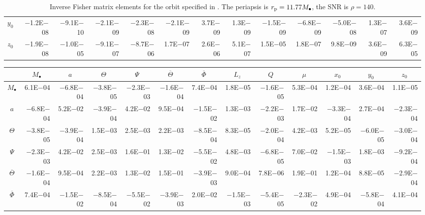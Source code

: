 \begin{sidewaystable}[htbp]
\begin{tabular}{crrrrrrrrrrrr}
$y_0$ & $-$1.2E$-$08 & $-$9.1E$-$10 & $-$2.1E$-$09 & $-$2.3E$-$08 & $-$2.1E$-$09 & 3.7E$-$09 & 1.3E$-$09 & $-$1.5E$-$09 & $-$6.8E$-$09 & $-$5.0E$-$08 & 1.3E$-$07 & 3.6E$-$09 \\
$z_0$ & $-$1.9E$-$08 & $-$1.0E$-$05 & $-$9.1E$-$07 & $-$8.7E$-$06 & 1.7E$-$07 & 2.6E$-$06 & 5.1E$-$07 & 1.5E$-$05 & 1.8E$-$07 & 9.8E$-$09 & 3.6E$-$09 & 6.3E$-$05 \\
\bottomrule
\end{tabular}
\caption{Inverse Fisher matrix elements for the orbit specified in . The periapsis is $r_\mathrm{p} = 11.77 M_\bullet$, the SNR is $\rho = 140$.}
\label{tab:Fisher_2}
\end{sidewaystable}
\begin{sidewaystable}[htbp]\scriptsize
\centering
\begin{tabular}{crrrrrrrrrrrr}
\toprule
 & \multicolumn{1}{c}{$M_\bullet$} & \multicolumn{1}{c}{$a$} & \multicolumn{1}{c}{$\Theta$} & \multicolumn{1}{c}{$\Psi$} & \multicolumn{1}{c}{$\overline{\Theta}$} & \multicolumn{1}{c}{$\overline{\Phi}$} & \multicolumn{1}{c}{$L_z$} & \multicolumn{1}{c}{$Q$} & \multicolumn{1}{c}{$\mu$} & \multicolumn{1}{c}{$x_0$} & \multicolumn{1}{c}{$y_0$} & \multicolumn{1}{c}{$z_0$} \\ \midrule 
$M_\bullet$ & 6.1E$-$04 & $-$6.8E$-$04 & $-$3.8E$-$05 & $-$2.3E$-$03 & $-$1.6E$-$04 & 7.4E$-$04 & 1.8E$-$05 & $-$1.6E$-$05 & 5.3E$-$04 & 1.2E$-$04 & 3.6E$-$04 & 1.1E$-$05 \\
$a$ & $-$6.8E$-$04 & 5.2E$-$02 & $-$3.9E$-$04 & 4.2E$-$02 & 9.5E$-$04 & $-$1.5E$-$02 & 1.3E$-$03 & $-$2.2E$-$03 & 1.7E$-$02 & $-$3.3E$-$04 & 2.7E$-$04 & $-$2.3E$-$04 \\
$\Theta$ & $-$3.8E$-$05 & $-$3.9E$-$04 & 1.5E$-$03 & 2.5E$-$03 & 2.2E$-$03 & $-$8.5E$-$04 & 8.3E$-$05 & $-$2.0E$-$04 & 4.2E$-$03 & 5.2E$-$05 & $-$6.0E$-$05 & $-$3.0E$-$04 \\
$\Psi$ & $-$2.3E$-$03 & 4.2E$-$02 & 2.5E$-$03 & 1.6E$-$01 & 1.3E$-$02 & $-$5.5E$-$02 & 4.8E$-$03 & $-$6.8E$-$05 & 7.0E$-$02 & $-$1.5E$-$03 & 1.8E$-$03 & $-$9.2E$-$04 \\
$\overline{\Theta}$ & $-$1.6E$-$04 & 9.5E$-$04 & 2.2E$-$03 & 1.3E$-$02 & 1.5E$-$01 & $-$3.9E$-$03 & 9.0E$-$04 & 7.8E$-$06 & 1.9E$-$01 & 1.2E$-$04 & 8.8E$-$05 & $-$2.9E$-$04 \\
$\overline{\Phi}$ & 7.4E$-$04 & $-$1.5E$-$02 & $-$8.5E$-$04 & $-$5.5E$-$02 & $-$3.9E$-$03 & 2.0E$-$02 & $-$1.5E$-$03 & $-$5.4E$-$05 & $-$2.3E$-$02 & 4.9E$-$04 & $-$5.8E$-$04 & 4.1E$-$04 \\

\end{tabular}
\end{sidewaystable}
